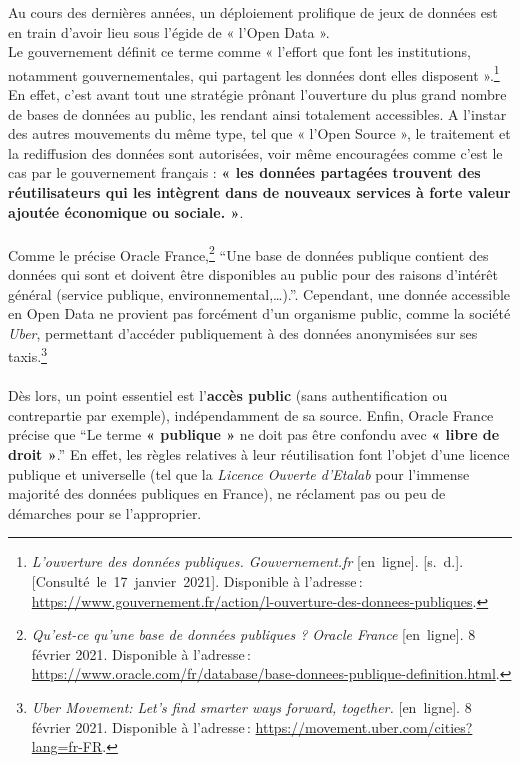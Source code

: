\documentclass[
  11pt,
  french,
]{article}
\begin{document}
Au cours des dernières années, un déploiement prolifique de jeux de
données est en train d'avoir lieu sous l'égide de « l'Open Data ».\\
Le gouvernement définit ce terme comme « l'effort que font les
institutions, notamment gouvernementales, qui partagent les données dont
elles disposent ».\footnote{\emph{L'ouverture des données publiques.
  Gouvernement.fr} {[}en~ligne{]}. {[}s.~d.{]}.
  {[}Consulté~le~17~janvier~2021{]}. Disponible à l'adresse\,:
  \url{https://www.gouvernement.fr/action/l-ouverture-des-donnees-publiques}.}
En effet, c'est avant tout une stratégie prônant l'ouverture du plus
grand nombre de bases de données au public, les rendant ainsi totalement
accessibles. A l'instar des autres mouvements du même type, tel que «
l'Open Source », le traitement et la rediffusion des données sont
autorisées, voir même encouragées comme c'est le cas par le gouvernement
français : \textbf{« les données partagées trouvent des réutilisateurs
qui les intègrent dans de nouveaux services à forte valeur ajoutée
économique ou sociale. »}.\\
~\\
Comme le précise Oracle France,\footnote{\emph{Qu'est-ce qu'une base de
  données publiques ? \textbar{} Oracle France} {[}en~ligne{]}. 8
  février 2021. Disponible à l'adresse\,:
  \url{https://www.oracle.com/fr/database/base-donnees-publique-definition.html}.}
``Une base de données publique contient des données qui sont et doivent
être disponibles au public pour des raisons d'intérêt général (service
publique, environnemental,\ldots).''. Cependant, une donnée accessible
en Open Data ne provient pas forcément d'un organisme public, comme la
société \emph{Uber}, permettant d'accéder publiquement à des données
anonymisées sur ses taxis.\footnote{\emph{Uber Movement: Let's find
  smarter ways forward, together.} {[}en~ligne{]}. 8 février 2021.
  Disponible à l'adresse\,:
  \url{https://movement.uber.com/cities?lang=fr-FR}.}\\
~\\
Dès lors, un point essentiel est l'\textbf{accès public} (sans
authentification ou contrepartie par exemple), indépendamment de sa
source. Enfin, Oracle France précise que ``Le terme \textbf{« publique
»} ne doit pas être confondu avec \textbf{« libre de droit »}.'' En
effet, les règles relatives à leur réutilisation font l'objet d'une
licence publique et universelle (tel que la \emph{Licence Ouverte
d'Etalab} pour l'immense majorité des données publiques en France), ne
réclament pas ou peu de démarches pour se l'approprier.\\
\end{document}
